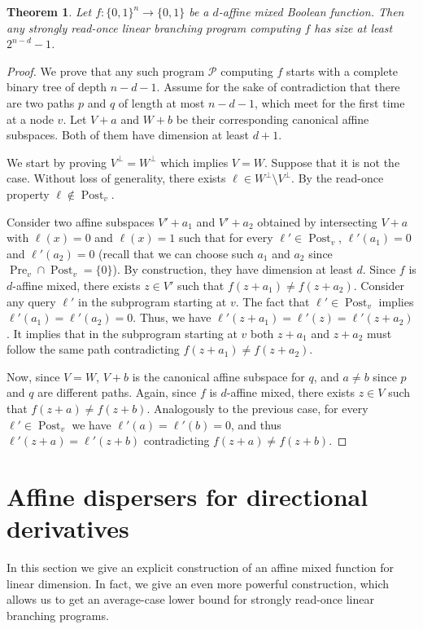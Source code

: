 \documentclass[a4paper,11pt,draft]{article}
\newtheorem{theorem}{Theorem}
\theoremstyle{definition}
\theoremstyle{remark}
\DeclareMathOperator{\pre}{Pre}
\DeclareMathOperator{\post}{Post}
\newcommand{\orth}[1]{{#1}^{\perp}}
\newcommand{\Q}{{\{0,1\}}}
\newcommand{\calP}{\mathcal{P}}
\newcommand{\sreadonce}{strongly read-once}
\newcommand{\readonce}{read-once}
\begin{document}
\begin{theorem}
  Let $f\colon \Q^n \to \Q$ be a $d$-affine mixed Boolean function. Then any \sreadonce{} linear branching program computing $f$ has size at least $2^{n-d}-1$.
\end{theorem}
\begin{proof}
  We prove that any such program $\calP$ computing $f$ starts with a complete binary tree of depth $n-d-1$. Assume for the sake of contradiction that there are two paths $p$ and $q$ of length at most $n-d-1$, which meet for the first time at a node $v$. Let $V+a$ and $W+b$ be their corresponding canonical affine subspaces. Both of them have dimension at least $d+1$.

  We start by proving $\orth{V} = \orth{W}$ which implies $V = W$. Suppose that it is not the case. Without loss of generality, there exists $\ell \in \orth{W} \setminus \orth{V}$. By the \readonce{} property $\ell \not\in \post_v$.

  Consider two affine subspaces $V'+a_1$ and $V'+a_2$ obtained by intersecting $V+a$ with $\ell(x) = 0$ and $\ell(x)=1$ such that for every $\ell' \in \post_v$, $\ell'(a_1) = 0$ and $\ell'(a_2) = 0$ (recall that we can choose such $a_1$ and $a_2$ since $\pre_v \cap \post_v = \{0\}$). By construction, they have dimension at least $d$.
  Since $f$ is $d$-affine mixed, there exists $z \in V'$ such that $f(z+a_1) \neq f(z+a_2)$.
  Consider any query $\ell'$ in the subprogram starting at $v$. The fact that $\ell' \in \post_v$ implies $\ell'(a_1) = \ell'(a_2) = 0$. Thus, we have $\ell'(z+a_1) = \ell'(z) = \ell'(z+a_2)$. It implies that in the subprogram starting at $v$ both $z+a_1$ and $z+a_2$ must follow the same path contradicting $f(z+a_1) \neq f(z+a_2)$.

  Now, since $V = W$, $V+b$ is the canonical affine subspace for $q$, and $a \ne b$ since $p$ and $q$ are different paths.
  Again, since $f$ is $d$-affine mixed, there exists $z \in V$ such that $f(z+a) \neq f(z+b)$. Analogously to the previous case, for every $\ell' \in \post_v$ we have $\ell'(a)=\ell'(b)=0$, and thus $\ell'(z+a) = \ell'(z+b)$ contradicting $f(z+a) \neq f(z+b)$.
\end{proof}

\section{Affine dispersers for directional derivatives}

In this section we give an explicit construction of an affine mixed function for linear dimension. In fact, we give an even more powerful construction, which allows us to get an average-case lower bound for \sreadonce{} linear branching programs.
\end{document}
